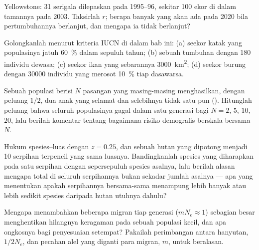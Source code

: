 \begin{exercise}[$\star\star$]\label{exo:b3:conservation-biology:8}
Yellowstone: 31 serigala dilepaskan pada 1995--96, sekitar 100 ekor di
dalam tamannya pada 2003. Taksirlah $r$; berapa banyak yang akan ada pada
2020 bila pertumbuhannya berlanjut, dan mengapa ia tidak berlanjut?
\end{exercise}

\begin{exercise}[$\star\star$]\label{exo:b3:conservation-biology:9}
Golongkanlah menurut kriteria IUCN di dalam bab ini: (a) seekor katak yang
populasinya jatuh \qty{60}{\%} dalam sepuluh tahun; (b) sebuah tumbuhan
dengan 180 individu dewasa; (c) seekor ikan yang sebarannya
\qty{3000}{km^2}; (d) seekor burung dengan \num{30000} individu yang
merosot \qty{10}{\%} tiap dasawarsa.
\end{exercise}

\begin{exercise}[$\star\star\star$]\label{exo:b3:conservation-biology:10}
Sebuah populasi berisi $N$ pasangan yang masing-masing menghasilkan,
dengan peluang $1/2$, dua anak yang selamat dan selebihnya tidak satu pun
(). Hitunglah peluang bahwa seluruh populasinya
gagal dalam satu generasi bagi $N = 2$, $5$, $10$, $20$, lalu berilah
komentar tentang bagaimana risiko demografis berskala bersama $N$.
\end{exercise}

\begin{exercise}[$\star\star\star$]\label{exo:b3:conservation-biology:11}
Hukum spesies--luas dengan $z = 0.25$, dan sebuah hutan yang dipotong
menjadi 10 serpihan terpencil yang sama luasnya. Bandingkanlah spesies
yang diharapkan pada satu serpihan dengan sepersepuluh spesies asalnya,
lalu berilah alasan mengapa total di seluruh serpihannya bukan sekadar
jumlah asalnya --- apa yang menentukan apakah serpihannya bersama-sama
menampung lebih banyak atau lebih sedikit spesies daripada hutan utuhnya dahulu?
\end{exercise}

\begin{exercise}[$\star\star\star$]\label{exo:b3:conservation-biology:12}
Mengapa menambahkan beberapa migran tiap generasi ($m N_{e} \approx 1$)
sebagian besar menghentikan hilangnya keragaman pada sebuah populasi
kecil, dan apa ongkosnya bagi penyesuaian setempat? Pakailah perimbangan
antara hanyutan, $1/2N_{e}$, dan pecahan alel yang diganti para migran,
$m$, untuk beralasan.
\end{exercise}

